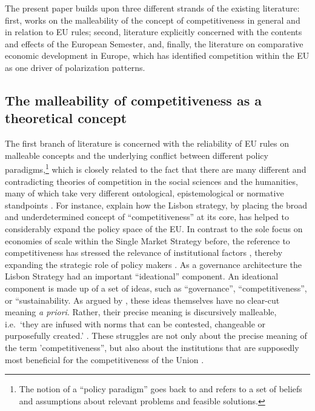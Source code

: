 \documentclass[
]{article}
\begin{document}
The present paper builds upon three different strands of the existing literature:
first, works on the malleability of the concept of competitiveness in
general and in relation to EU rules; second, literature explicitly concerned
with the contents and effects of the European Semester, and, finally, the
literature on comparative economic development in Europe, which has identified
competition within the EU as one driver of polarization patterns.

\hypertarget{subsec:malleab}{%
\subsection{The malleability of competitiveness as a theoretical concept}\label{subsec:malleab}}

The first branch of literature is concerned with the reliability of EU rules
on malleable concepts and the underlying conflict between different policy
paradigms,\footnote{The notion of a \enquote{policy paradigm} goes back to \citet{hall:1993} and refers
  to a set of beliefs and assumptions about relevant problems and feasible
  solutions.}
which is closely related to the fact that
there are many different and contradicting theories of competition in the
social sciences and the humanities, many of which take very different
ontological, epistemological or normative standpoints
\citep[e.g.][]{altreiter2}.
For instance, \citet{Borras2011} explain how the Lisbon strategy,
by placing the broad and underdetermined concept of \enquote{competitiveness} at its
core, has helped to considerably expand the policy space of the EU. In contrast to
the sole focus on economies of scale within the Single Market Strategy before, the
reference to competitiveness has stressed the relevance of institutional factors
\citep[p. 474]{Borras2011}, thereby expanding the
strategic role of policy makers \citep[e.g.][]{davies}.
As a governance architecture the Lisbon Strategy had an important \enquote{ideational}
component. An ideational component
is made up of a set of ideas, such as \enquote{governance}, \enquote{competitiveness}, or \enquote{sustainability.
As argued by \citet{Borras2011}, these
ideas themselves have no clear-cut meaning \emph{a priori}. Rather, their precise meaning
is discursively malleable, i.e.~\enquote{they are infused with norms that
can be contested, changeable or purposefully created.} \citep[p. 470]{Borras2011}.
These struggles are not only about the precise meaning of the term
'competitiveness}, but also about the institutions that are supposedly
most beneficial for the competitiveness of the Union
\citep[see also][]{Princen2016}.
\end{document}
